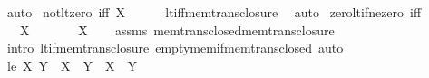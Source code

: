 \begin{isabellebody}
\ auto%
\endisatagproof
{\isafoldproof}%
%
\isadelimproof
\isanewline
%
\endisadelimproof
\isanewline
{}\isamarkupfalse%
\ not{\isacharunderscore}{\kern0pt}lt{\isacharunderscore}{\kern0pt}zero\ {\isacharbrackleft}{\kern0pt}iff{\isacharbrackright}{\kern0pt}{\isacharcolon}{\kern0pt}\ {\isachardoublequoteopen}{\isasymnot}{\isacharparenleft}{\kern0pt}X\ {\isacharless}{\kern0pt}\ {}{\isacharparenright}{\kern0pt}{\isachardoublequoteclose}\isanewline
%
\isadelimproof
\ \ %
\endisadelimproof
%
\isatagproof
{}\isamarkupfalse%
\ lt{\isacharunderscore}{\kern0pt}iff{\isacharunderscore}{\kern0pt}mem{\isacharunderscore}{\kern0pt}trans{\isacharunderscore}{\kern0pt}closure\ \isamarkupfalse%
\ auto%
\endisatagproof
{\isafoldproof}%
%
\isadelimproof
\isanewline
%
\endisadelimproof
\isanewline
{}\isamarkupfalse%
\ zero{\isacharunderscore}{\kern0pt}lt{\isacharunderscore}{\kern0pt}if{\isacharunderscore}{\kern0pt}ne{\isacharunderscore}{\kern0pt}zero\ {\isacharbrackleft}{\kern0pt}iff{\isacharbrackright}{\kern0pt}{\isacharcolon}{\kern0pt}\isanewline
\ \ \ {\isachardoublequoteopen}X\ {\isasymnoteq}\ {}{\isachardoublequoteclose}\isanewline
\ \ \ {\isachardoublequoteopen}{}\ {\isacharless}{\kern0pt}\ X{\isachardoublequoteclose}\isanewline
%
\isadelimproof
\ \ %
\endisadelimproof
%
\isatagproof
{}\isamarkupfalse%
\ assms\ mem{\isacharunderscore}{\kern0pt}trans{\isacharunderscore}{\kern0pt}closed{\isacharunderscore}{\kern0pt}mem{\isacharunderscore}{\kern0pt}trans{\isacharunderscore}{\kern0pt}closure\isanewline
\ \ \isamarkupfalse%
\ {\isacharparenleft}{\kern0pt}intro\ lt{\isacharunderscore}{\kern0pt}if{\isacharunderscore}{\kern0pt}mem{\isacharunderscore}{\kern0pt}trans{\isacharunderscore}{\kern0pt}closure\ empty{\isacharunderscore}{\kern0pt}mem{\isacharunderscore}{\kern0pt}if{\isacharunderscore}{\kern0pt}mem{\isacharunderscore}{\kern0pt}trans{\isacharunderscore}{\kern0pt}closed{\isacharparenright}{\kern0pt}\ auto%
\endisatagproof
{\isafoldproof}%
%
\isadelimproof
%
\endisadelimproof
%
\isadelimdocument
%
\endisadelimdocument
%
\isatagdocument
%
\isamarkuptrue%
%
\endisatagdocument
{\isafolddocument}%
%
\isadelimdocument
%
\endisadelimdocument
{}\isamarkupfalse%
\ {\isachardoublequoteopen}le\ X\ Y\ {\isasymequiv}\ X\ {\isacharless}{\kern0pt}\ Y\ {\isasymor}\ X\ {\isacharequal}{\kern0pt}\ Y{\isachardoublequoteclose}\isanewline
\isanewline
{}\isamarkupfalse%

\end{isabellebody}
